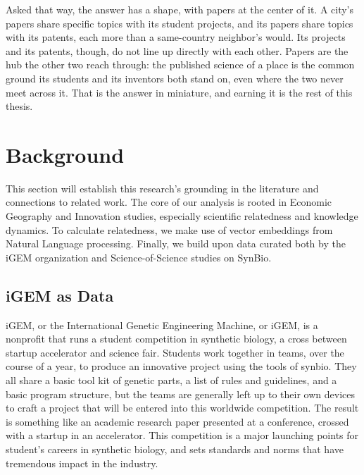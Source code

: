 \documentclass[12pt,a4paper]{article}
\begin{document}
	Asked that way, the answer has a shape, with papers at the center of it. A city's papers share specific topics with its student projects, and its papers share topics with its patents, each more than a same-country neighbor's would. Its projects and its patents, though, do not line up directly with each other. Papers are the hub the other two reach through: the published science of a place is the common ground its students and its inventors both stand on, even where the two never meet across it. That is the answer in miniature, and earning it is the rest of this thesis.
	
	
	\section{Background}
	
	This section will establish this research's grounding in the literature and connections to related work. The core of our analysis is rooted in Economic Geography and Innovation studies, especially scientific relatedness and knowledge dynamics. To calculate relatedness, we make use of vector embeddings from Natural Language processing. Finally, we build upon data curated both by the iGEM organization and Science-of-Science studies on SynBio.
	
		\subsection{iGEM as Data}
	
	iGEM, or the International Genetic Engineering Machine, or iGEM, is a nonprofit that runs a student competition in synthetic biology, a cross between startup accelerator and science fair. Students work together in teams, over the course of a year, to produce an innovative project using the tools of synbio. They all share a basic tool kit of genetic parts, a list of rules and guidelines, and a basic program structure, but the teams are generally left up to their own devices to craft a project that will be entered into this worldwide competition. The result is something like an academic research paper presented at a conference, crossed with a startup in an accelerator. This competition is a major launching points for student's careers in synthetic biology, and sets standards and norms that have tremendous impact in the industry.
	
\end{document}
